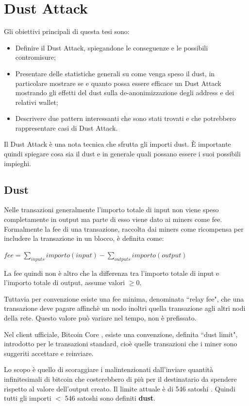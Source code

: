 \chapter{Dust Attack}
Gli obiettivi principali di questa tesi sono:
\begin{itemize}
\item Definire il Dust Attack, spiegandone le conseguenze e le possibili contromisure;
    \item Presentare delle statistiche generali su come venga speso il dust, in particolare mostrare se e quanto possa essere efficace un Dust Attack mostrando gli effetti del dust sulla de-anonimizzazione degli address e dei relativi wallet;
    \item Descrivere due pattern interessanti che sono stati trovati e che potrebbero rappresentare casi di Dust Attack.
\end{itemize}

Il Dust Attack è una nota tecnica che sfrutta gli importi dust. È importante quindi spiegare cosa sia il dust e in generale quali possano essere i suoi possibili impieghi.
\section{Dust}
Nelle transazioni generalmente l'importo totale di input non viene speso completamente in output ma parte di esso viene dato ai miners come fee. Formalmente la fee di una transazione, raccolta dai miners come ricompensa per includere la transazione in un blocco, è definita come:
\begin{center}
    $fee = \sum_{inputs} importo(input) - \sum_{outputs} importo(output)$
\end{center}
La fee quindi non è altro che la differenza tra l'importo totale di input e l'importo totale di output, assume valori $\ge 0$. 

Tuttavia per convenzione esiste una fee minima, denominata ``relay fee", che una transazione deve pagare affinchè un nodo inoltri quella transazione agli altri nodi della rete. Questo valore può variare nel tempo, non è prefissato. 

Nel client ufficiale, Bitcoin Core \cite{btccore}, esiste una convenzione, definita ``dust limit", introdotto per le transazioni standard, cioè quelle transazioni che i miner sono suggeriti accettare e reinviare.

Lo scopo è quello di scoraggiare i malintenzionati dall'inviare quantità infinitesimali di bitcoin che costerebbero di più per il destinatario da spendere rispetto al valore dell'output creato. Il limite attuale è di 546 satoshi \cite{BtcDev}. Quindi tutti gli importi $<$ 546 satoshi sono definiti \textbf{dust}.
